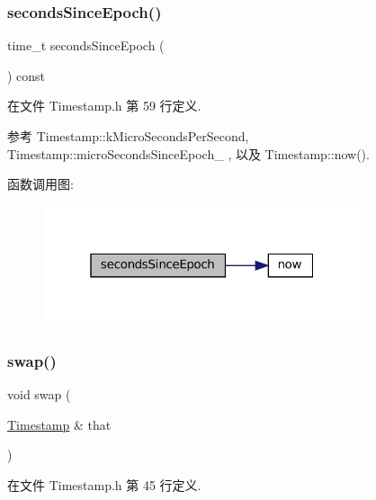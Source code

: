 \subsubsection{\texorpdfstring{seconds\+Since\+Epoch()}{secondsSinceEpoch()}}
{\footnotesize\ttfamily time\+\_\+t seconds\+Since\+Epoch (\begin{DoxyParamCaption}{ }\end{DoxyParamCaption}) const\hspace{0.3cm}{\ttfamily [inline]}}



在文件 Timestamp.\+h 第 59 行定义.



参考 Timestamp\+::k\+Micro\+Seconds\+Per\+Second, Timestamp\+::micro\+Seconds\+Since\+Epoch\+\_\+ , 以及 Timestamp\+::now().

函数调用图\+:
\nopagebreak
\begin{figure}[H]
\begin{center}
\leavevmode
\includegraphics[width=265pt]{classmuduo_1_1Timestamp_a71e46e0dc3ff552a361dfe7dc32847b5_cgraph}
\end{center}
\end{figure}
\mbox{\label{classmuduo_1_1Timestamp_aa405c6fb7c29a07e1924fa0b4d846638}} 
\subsubsection{\texorpdfstring{swap()}{swap()}}
{\footnotesize\ttfamily void swap (\begin{DoxyParamCaption}\item[{\hyperlink{classmuduo_1_1Timestamp}{Timestamp} \&}]{that }\end{DoxyParamCaption})\hspace{0.3cm}{\ttfamily [inline]}}



在文件 Timestamp.\+h 第 45 行定义.



